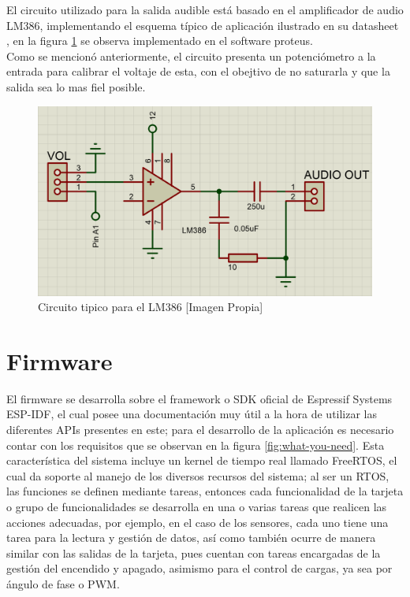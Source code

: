 		El circuito utilizado para la salida audible está basado en el amplificador de audio LM386, implementando el esquema típico de aplicación ilustrado en su datasheet \cite{LM386}, en la figura \ref{fig:AUD} se observa implementado en el software proteus.\\
		
		Como se mencionó anteriormente, el circuito presenta un potenciómetro a la entrada para calibrar el voltaje de esta, con el obejtivo de no saturarla y que la salida sea lo mas fiel posible.\\
		
		\begin{figure}[H]
			\centering
			\caption{Circuito tipico para el LM386 [Imagen Propia]}
			\label{fig:AUD}
			\includegraphics[width=0.7\linewidth]{Imagenes/AUD}
		\end{figure}		
				
\section{Firmware}

El firmware se desarrolla sobre el framework o SDK oficial de Espressif Systems ESP-IDF, el cual posee una documentación \cite{ES} muy útil a la hora de utilizar las diferentes APIs presentes en este; para el desarrollo de la aplicación es necesario contar con los requisitos que se observan en la figura \ref{fig:what-you-need}. Esta característica del sistema incluye un kernel de tiempo real llamado FreeRTOS, el cual da soporte al manejo de los diversos recursos del sistema; al ser un RTOS, las funciones se definen mediante tareas, entonces cada funcionalidad de la tarjeta o grupo de funcionalidades se desarrolla en una o varias tareas que realicen las acciones adecuadas, por ejemplo, en el caso de los sensores, cada uno tiene una tarea para la lectura y gestión de datos, así como también ocurre de manera similar con las salidas de la tarjeta, pues cuentan con tareas encargadas de la gestión del encendido y apagado, asimismo para el control de cargas, ya sea por ángulo de fase o PWM.\\

